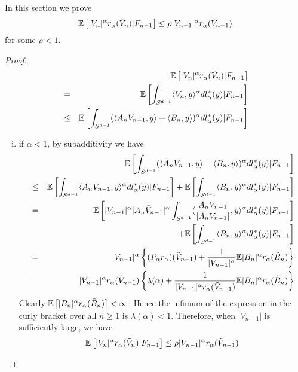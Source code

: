 \documentclass{article}
\begin{document}
In this section we prove
\[
\mathbb{E} \left[ |V_n|^\alpha r_\alpha(\tilde V_n) | F_{n-1} \right] \leq
\rho |V_{n-1}|^\alpha r_\alpha(\tilde V_{n-1})
\]
for some $\rho < 1$.
\begin{proof}
  \begin{eqnarray*}
    && \mathbb{E} \left[ |V_n|^\alpha r_\alpha(\tilde V_n) | F_{n-1} \right]
    \\
    &=& \mathbb{E}\left[\int_{S^{d-1}} \langle V_n, y\rangle^\alpha dl^*_\alpha(y)|
      F_{n-1} \right]
    \\
    &\leq& \mathbb{E}\left[\int_{S^{d-1}} (\langle A_n V_{n-1}, y\rangle + \langle B_n,
        y\rangle)^\alpha dl^*_\alpha(y) | F_{n-1} \right]
  \end{eqnarray*}
  \begin{enumerate}[(i)]
  \item if $\alpha < 1$, by subadditivity we have
    \begin{eqnarray*}
      &&\mathbb{E}\left[\int_{S^{d-1}} (\langle A_n V_{n-1}, y\rangle + \langle B_n,
          y\rangle)^\alpha dl^*_\alpha(y) | F_{n-1} \right]\\
      &\leq& \mathbb{E}\left[\int_{S^{d-1}} \langle A_n V_{n-1}, y\rangle^\alpha
        dl^*_\alpha(y) | F_{n-1} \right]
      + \mathbb{E}\left[\int_{S^{d-1}} \langle B_n, y\rangle^\alpha dl^*_\alpha(y) |
        F_{n-1} \right] \\
      &=& \mathbb{E}\left[|V_{n-1}|^\alpha |A_n \tilde V_{n-1}|^\alpha\int_{S^{d-1}}
        \langle{A_n V_{n-1} \over |A_n V_{n-1}|}, y\rangle^\alpha
        dl^*_\alpha(y) | F_{n-1} \right] \\
      && + \mathbb{E}\left[\int_{S^{d-1}} \langle B_n, y\rangle^\alpha dl^*_\alpha(y) |
        F_{n-1} \right] \\
      &=& |V_{n-1}|^\alpha \left\{
        (P_\alpha r_\alpha)(\tilde V_{n-1}) +
        {1 \over |V_{n-1}|^\alpha} \mathbb{E} |B_n|^\alpha r_\alpha(\tilde
        B_n) \right\} \\
      &=& |V_{n-1}|^\alpha r_\alpha(\tilde V_{n-1})\left\{
        \lambda(\alpha) +
        {1 \over |V_{n-1}|^\alpha r_\alpha(\tilde V_{n-1})} \mathbb{E}
        |B_n|^\alpha r_\alpha(\tilde B_n) \right\} \\
    \end{eqnarray*}
    Clearly $\mathbb{E}\left[|B_n|^\alpha r_\alpha(\tilde B_n)\right] <
    \infty$. Hence the infimum of the expression in the curly bracket
    over all $n \geq 1$ is $\lambda(\alpha) < 1$. Therefore, when
    $|V_{n-1}|$ is sufficiently large, we have
    \[
    \mathbb{E} \left[ |V_n|^\alpha r_\alpha(\tilde V_n) | F_{n-1} \right] \leq
    \rho |V_{n-1}|^\alpha r_\alpha(\tilde V_{n-1})
    \]
    

\end{enumerate}
\end{proof}
\end{document}
